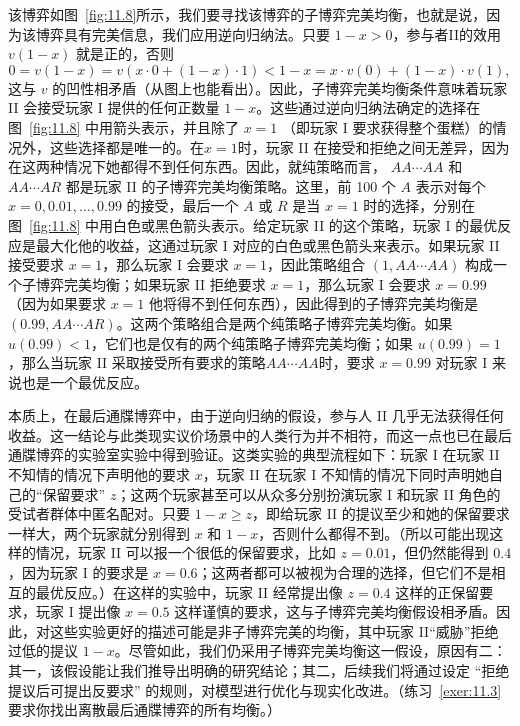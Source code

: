 该博弈如图~\ref{fig:11.8}所示，我们要寻找该博弈的子博弈完美均衡，也就是说，因为该博弈具有完美信息，我们应用逆向归纳法。只要 \(1 - x > 0\)，参与者II的效用 \(v\left( {1 - x}\right)\) 就是正的，否则
\[
0 = v\left( {1 - x}\right)  = v\left( {x \cdot  0 + \left( {1 - x}\right)  \cdot  1}\right)  < 1 - x = x \cdot  v\left( 0\right)  + \left( {1 - x}\right)  \cdot  v\left( 1\right),
\]
这与 \(v\) 的凹性相矛盾（从图上也能看出）。因此，子博弈完美均衡条件意味着玩家 II 会接受玩家 I 提供的任何正数量 \(1 - x\)。这些通过逆向归纳法确定的选择在图~\ref{fig:11.8} 中用箭头表示，并且除了 \(x = 1\) （即玩家 I 要求获得整个蛋糕）的情况外，这些选择都是唯一的。在\(x = 1\)时，玩家 II 在接受和拒绝之间无差异，因为在这两种情况下她都得不到任何东西。因此，就纯策略而言， \({AA}\cdots {AA}\) 和 \({AA}\cdots {AR}\) 都是玩家 II 的子博弈完美均衡策略。这里，前 100 个 \(A\) 表示对每个 \(x = 0,{0.01},\ldots,{0.99}\) 的接受，最后一个 \(A\) 或 \(R\) 是当 \(x = 1\) 时的选择，分别在图~\ref{fig:11.8} 中用白色或黑色箭头表示。给定玩家 II 的这个策略，玩家 I 的最优反应是最大化他的收益，这通过玩家 I 对应的白色或黑色箭头来表示。如果玩家 II 接受要求 \(x = 1\)，那么玩家 I 会要求 \(x = 1\)，因此策略组合 \(\left( {1,{AA}\cdots {AA}}\right)\) 构成一个子博弈完美均衡；如果玩家 II 拒绝要求 \(x = 1\)，那么玩家 I 会要求 \(x = {0.99}\) （因为如果要求 \(x = 1\) 他将得不到任何东西），因此得到的子博弈完美均衡是 \(\left( {{0.99},{AA}\cdots {AR}}\right)\)。这两个策略组合是两个纯策略子博弈完美均衡。如果 \(u\left( {0.99}\right)  < 1\)，它们也是仅有的两个纯策略子博弈完美均衡；如果 \(u\left( {0.99}\right)  = 1\)，那么当玩家 II 采取接受所有要求的策略\({AA}\cdots {AA}\)时，要求 \(x = {0.99}\) 对玩家 I 来说也是一个最优反应。

本质上，在最后通牒博弈中，由于逆向归纳的假设，参与人 II 几乎无法获得任何收益。这一结论与此类现实议价场景中的人类行为并不相符，而这一点也已在最后通牒博弈的实验室实验中得到验证。这类实验的典型流程如下：玩家 I 在玩家 II 不知情的情况下声明他的要求 \(x\)，玩家 II 在玩家 I 不知情的情况下同时声明她自己的“保留要求” \(z\)；这两个玩家甚至可以从众多分别扮演玩家 I 和玩家 II 角色的受试者群体中匿名配对。只要 \(1 - x \geq  z\)，即给玩家 II 的提议至少和她的保留要求一样大，两个玩家就分别得到 \(x\) 和 \(1 - x\)，否则什么都得不到。（所以可能出现这样的情况，玩家 II 可以报一个很低的保留要求，比如 \(z = {0.01}\)，但仍然能得到 $0.4$，因为玩家 I 的要求是 \(x = {0.6}\)；这两者都可以被视为合理的选择，但它们不是相互的最优反应。）在这样的实验中，玩家 II 经常提出像 \(z = {0.4}\) 这样的正保留要求，玩家 I 提出像 \(x = {0.5}\) 这样谨慎的要求，这与子博弈完美均衡假设相矛盾。因此，对这些实验更好的描述可能是非子博弈完美的均衡，其中玩家 II“威胁”拒绝过低的提议 \(1 - x\)。尽管如此，我们仍采用子博弈完美均衡这一假设，原因有二：其一，该假设能让我们推导出明确的研究结论；其二，后续我们将通过设定 “拒绝提议后可提出反要求” 的规则，对模型进行优化与现实化改进。（练习~\ref{exer:11.3} 要求你找出离散最后通牒博弈的所有均衡。）

